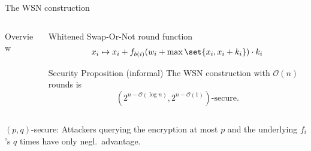 \begin{frame}{The WSN construction}
\begin{columns}
\begin{column}{0.49\textwidth}
\begin{block}{Overview\vpPp}
                \vspace*{13pt}
            \end{block}
        \end{column}
        \begin{column}{0.49\textwidth}
            \begin{block}{Whitened Swap-Or-Not round function}
                \vspace*{-10pt}
                \begin{equation*}
                    x_i \mapsto x_i + f_{b(i)}(w_i + \max \set{x_i, x_i + k_i}) \cdot k_i
                \end{equation*}
            \end{block}

            \begin{block}{Security Proposition (informal)}
                The WSN construction with $\mathcal{O}(n)$ rounds is
                \begin{equation*}
                    (2^{n-\mathcal{O}(\log n)}, 2^{n-\mathcal{O}(1)})\text{-secure}.
                \end{equation*}
            \end{block}
        \end{column}
    \end{columns}
    \begingroup
        \vspace{10pt}
        \footnotesize
        $(p, q)$-secure: Attackers querying the encryption at most $p$ and the underlying $f_i$'s $q$ times have only negl.\ advantage.
    \endgroup
    \blfootnote{}
\end{frame}

